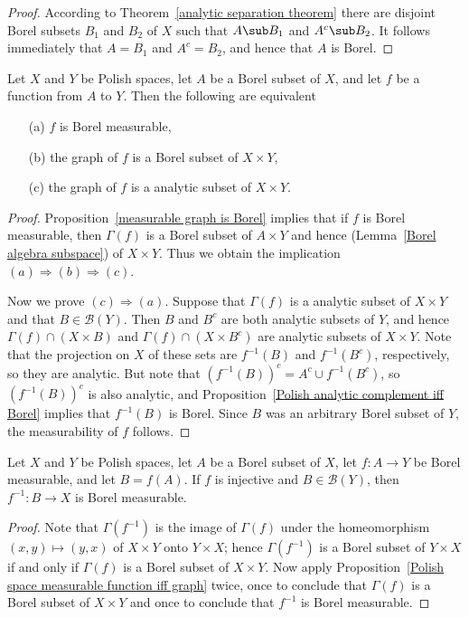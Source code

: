 \begin{proof}
According to Theorem~\ref{analytic separation theorem} there are disjoint Borel subsets $B_1$ and $B_2$ of $X$ such that $A\sub B_1$ and $A^c\sub B_2$. It follows immediately that $A=B_1$ and $A^c=B_2$, and hence that $A$ is Borel.
\end{proof}
\begin{proposition}\label{Polish space measurable function iff graph}
Let $X$ and $Y$ be Polish spaces, let $A$ be a Borel subset of $X$, and let $f$ be a function from $A$ to $Y$. Then the following are equivalent
\begin{itemize}
\item[(a)] $f$ is Borel measurable,
\item[(b)] the graph of $f$ is a Borel subset of $X\times Y$,
\item[(c)] the graph of $f$ is a analytic subset of $X\times Y$.
\end{itemize}
\end{proposition}
\begin{proof}
Proposition~\ref{measurable graph is Borel} implies that if $f$ is Borel measurable, then $\Gamma(f)$ is a Borel subset of $A\times Y$ and hence (Lemma~\ref{Borel algebra subspace}) of $X\times Y$. Thus we obtain the implication $(a)\Rightarrow(b)\Rightarrow(c)$.\par
Now we prove $(c)\Rightarrow(a)$. Suppose that $\Gamma(f)$ is a analytic subset of $X\times Y$ and that $B\in\mathcal{B}(Y)$. Then $B$ and $B^c$ are both analytic subsets of $Y$, and hence $\Gamma(f)\cap (X\times B)$ and $\Gamma(f)\cap (X\times B^c)$ are analytic subsets of $X\times Y$. Note that the projection on $X$ of these sets are $f^{-1}(B)$ and $f^{-1}(B^c)$, respectively, so they are analytic. But note that $(f^{-1}(B))^c=A^c\cup f^{-1}(B^c)$, so $(f^{-1}(B))^c$ is also analytic, and Proposition~\ref{Polish analytic complement iff Borel} implies that $f^{-1}(B)$ is Borel. Since $B$ was an arbitrary Borel subset of $Y$, the measurability of $f$ follows.
\end{proof}
\begin{proposition}\label{Polish injective measurable inverse is measurable}
Let $X$ and $Y$ be Polish spaces, let $A$ be a Borel subset of $X$, let $f:A\to Y$ be Borel measurable, and let $B=f(A)$. If $f$ is injective and $B\in\mathcal{B}(Y)$, then $f^{-1}:B\to X$ is Borel measurable.
\end{proposition}
\begin{proof}
Note that $\Gamma(f^{-1})$ is the image of $\Gamma(f)$ under the homeomorphism $(x,y)\mapsto(y,x)$ of $X\times Y$ onto $Y\times X$; hence $\Gamma(f^{-1})$ is a Borel subset of $Y\times X$ if and only if $\Gamma(f)$ is a Borel subset of $X\times Y$. Now apply Proposition~\ref{Polish space measurable function iff graph} twice, once to conclude that $\Gamma(f)$ is a Borel subset of $X\times Y$ and once to conclude that $f^{-1}$ is Borel measurable.
\end{proof}
